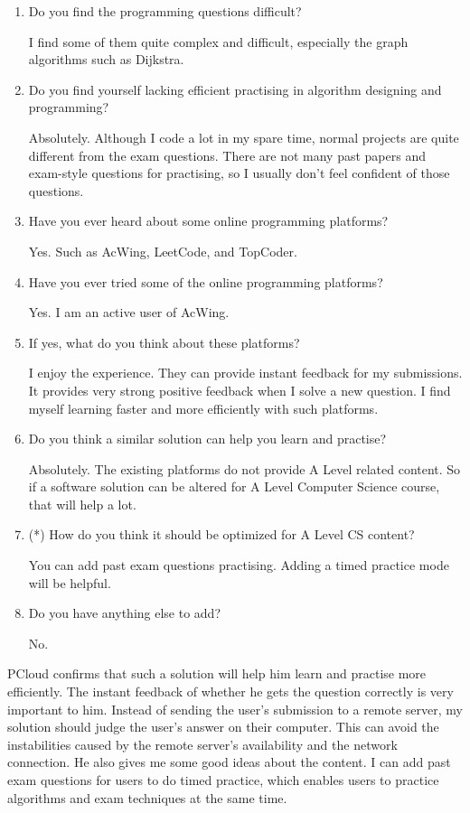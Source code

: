 \documentclass[a4paper]{report}
\begin{document}
\begin{enumerate}
    \item Do you find the programming questions difficult?

    I find some of them quite complex and difficult, especially the graph algorithms such as Dijkstra.

    \item Do you find yourself lacking efficient practising in algorithm designing and programming?

    Absolutely. Although I code a lot in my spare time, normal projects are quite different from the exam questions. There are not many past papers and exam-style questions for practising, so I usually don't feel confident of those questions.

    \item Have you ever heard about some online programming platforms?

    Yes. Such as AcWing, LeetCode, and TopCoder.

    \item Have you ever tried some of the online programming platforms?

    Yes. I am an active user of AcWing.

    \item If yes, what do you think about these platforms?

    I enjoy the experience. They can provide instant feedback for my submissions. It provides very strong positive feedback when I solve a new question. I find myself learning faster and more efficiently with such platforms.

    \item Do you think a similar solution can help you learn and practise?

    Absolutely. The existing platforms do not provide A Level related content. So if a software solution can be altered for A Level Computer Science course, that will help a lot.

    \item (*) How do you think it should be optimized for A Level CS content?

    You can add past exam questions practising. Adding a timed practice mode will be helpful.

    \item Do you have anything else to add?

    No.
\end{enumerate}

PCloud confirms that such a solution will help him learn and practise more efficiently. The instant feedback of whether he gets the question correctly is very important to him. Instead of sending the user's submission to a remote server, my solution should judge the user's answer on their computer. This can avoid the instabilities caused by the remote server's availability and the network connection. He also gives me some good ideas about the content. I can add past exam questions for users to do timed practice, which enables users to practice algorithms and exam techniques at the same time.
\end{document}
